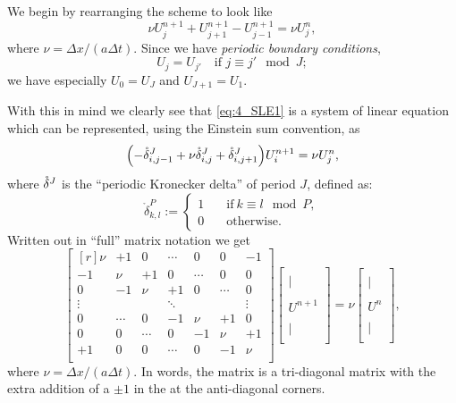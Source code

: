 \documentclass[11pt,letter, swedish, english
]{article}
\newcommand{\Dx}{\ensuremath{\Delta{x}}}
\newcommand{\Dt}{\ensuremath{\Delta{t}}}
\begin{document}
We begin by rearranging the scheme to look like
\begin{equation}\label{eq:4_SLE1}
\nu U_j^{n+1}+U_{j+1}^{n+1}-U_{j-1}^{n+1}=\nu U_j^n,
\end{equation}
where $\nu=\Dx/(a\Dt)$. 
Since we have \emph{periodic boundary conditions}\footnotemark{},
\begin{equation}
U_j=U_{j'}\quad\text{if }j\equiv j'\mod J;
\end{equation}
we have especially $U_0=U_J$ and $U_{J+1}=U_1$. 

With this in mind we clearly see that
\eqref{eq:4_SLE1} is a system of linear equation which can be
represented, using the Einstein sum convention, as
\begin{equation}
\qty(-{\mathring{\delta}^{J}_{i,j-1}}+\nu{\mathring{\delta}^{J}_{i, j}}+{\mathring{\delta}^{J}_{i, j+1}})U^{n+1}_i=\nu U_j^n,
\end{equation}
where ${\mathring{\delta}^{J}_{}}$ is the ``periodic Kronecker delta'' of period $J$,
defined as:
\begin{equation}
\mathring\delta^{P}_{k,l}:=
\begin{cases}
1\quad&\text{if}\ k\equiv l\mod P,\\
0&\text{otherwise}.
\end{cases}
\end{equation}
Written out in ``full'' matrix notation we get
\begin{equation}
\begin{bmatrix*}[r]
\nu&+1&0&\cdots&0&0&-1\\
-1&\nu&+1&0&\cdots&0&0\\
0&-1&\nu&+1&0&\cdots&0\\
\vdots&&&\ddots&&&\vdots\\
0&\cdots&0&-1&\nu&+1&0\\
0&0&\cdots&0&-1&\nu&+1\\
+1&0&0&\cdots&0&-1&\nu\\
\end{bmatrix*}
\begin{bmatrix*}
{}\\|\;\\{}\\U^{n+1}\\{}\\|\;\\{}
\end{bmatrix*}
=\nu
\begin{bmatrix*}
{}\\|\\{}\\U^{n}\\{}\\|\\{}
\end{bmatrix*},
\end{equation}
where $\nu=\Dx/(a\Dt)$. In words, the matrix is a tri-diagonal matrix 
with the extra addition of a $\pm1$ in the at the anti-diagonal
corners. 
\end{document}
